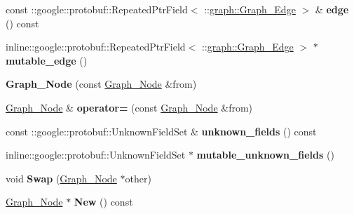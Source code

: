 \begin{DoxyCompactItemize}
\item 
\hypertarget{classgraph_1_1Graph__Node_a8d151fb4b6cf825838b1bcc3c9309935}{
const ::google::protobuf::RepeatedPtrField$<$ ::\hyperlink{classgraph_1_1Graph__Edge}{graph::Graph\_\-Edge} $>$ \& {\bfseries edge} () const }
\label{classgraph_1_1Graph__Node_a8d151fb4b6cf825838b1bcc3c9309935}

\item 
\hypertarget{classgraph_1_1Graph__Node_a7ee0a29b23254291137f2ff6d090fa08}{
inline::google::protobuf::RepeatedPtrField$<$ ::\hyperlink{classgraph_1_1Graph__Edge}{graph::Graph\_\-Edge} $>$ $\ast$ {\bfseries mutable\_\-edge} ()}
\label{classgraph_1_1Graph__Node_a7ee0a29b23254291137f2ff6d090fa08}

\item 
\hypertarget{classgraph_1_1Graph__Node_a3e14dbbb1960cdceb42a22f191851a6b}{
{\bfseries Graph\_\-Node} (const \hyperlink{classgraph_1_1Graph__Node}{Graph\_\-Node} \&from)}
\label{classgraph_1_1Graph__Node_a3e14dbbb1960cdceb42a22f191851a6b}

\item 
\hypertarget{classgraph_1_1Graph__Node_a1b117f5f955e29ec6e990e50cc2026e0}{
\hyperlink{classgraph_1_1Graph__Node}{Graph\_\-Node} \& {\bfseries operator=} (const \hyperlink{classgraph_1_1Graph__Node}{Graph\_\-Node} \&from)}
\label{classgraph_1_1Graph__Node_a1b117f5f955e29ec6e990e50cc2026e0}

\item 
\hypertarget{classgraph_1_1Graph__Node_a1292a0d7a11d6709ee0a3bffd699ddc6}{
const ::google::protobuf::UnknownFieldSet \& {\bfseries unknown\_\-fields} () const }
\label{classgraph_1_1Graph__Node_a1292a0d7a11d6709ee0a3bffd699ddc6}

\item 
\hypertarget{classgraph_1_1Graph__Node_a458590dbf61732e966b050e46a5b9ee0}{
inline::google::protobuf::UnknownFieldSet $\ast$ {\bfseries mutable\_\-unknown\_\-fields} ()}
\label{classgraph_1_1Graph__Node_a458590dbf61732e966b050e46a5b9ee0}

\item 
\hypertarget{classgraph_1_1Graph__Node_a7161b02ad669bb3c0eba53b5231467d9}{
void {\bfseries Swap} (\hyperlink{classgraph_1_1Graph__Node}{Graph\_\-Node} $\ast$other)}
\label{classgraph_1_1Graph__Node_a7161b02ad669bb3c0eba53b5231467d9}

\item 
\hypertarget{classgraph_1_1Graph__Node_a29347d8834678e64e08cddccc5c0a3dc}{
\hyperlink{classgraph_1_1Graph__Node}{Graph\_\-Node} $\ast$ {\bfseries New} () const }
\label{classgraph_1_1Graph__Node_a29347d8834678e64e08cddccc5c0a3dc}


\end{DoxyCompactItemize}
